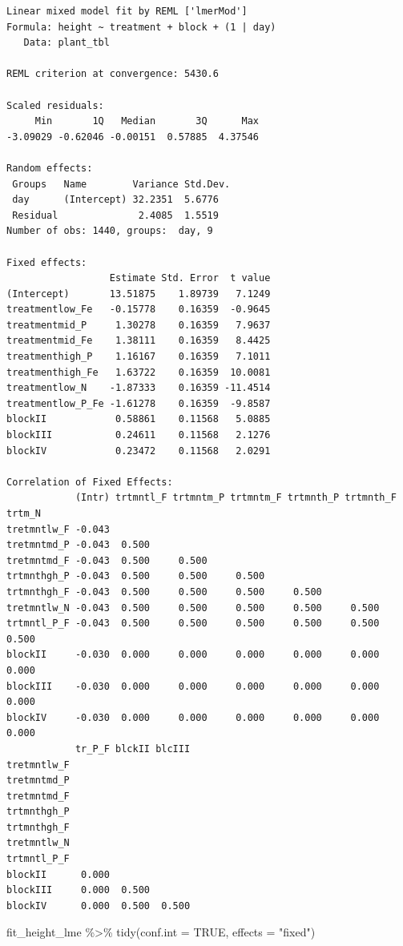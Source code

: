 \documentclass[
  letterpaper,
  DIV=11,
  oneside]{scrreport}
\newenvironment{Shaded}{\begin{snugshade}}{\end{snugshade}}
\newcommand{\AttributeTok}[1]{\textcolor[rgb]{0.40,0.45,0.13}{#1}}
\newcommand{\ConstantTok}[1]{\textcolor[rgb]{0.56,0.35,0.01}{#1}}
\newcommand{\FunctionTok}[1]{\textcolor[rgb]{0.28,0.35,0.67}{#1}}
\newcommand{\NormalTok}[1]{\textcolor[rgb]{0.00,0.23,0.31}{#1}}
\newcommand{\SpecialCharTok}[1]{\textcolor[rgb]{0.37,0.37,0.37}{#1}}
\newcommand{\StringTok}[1]{\textcolor[rgb]{0.13,0.47,0.30}{#1}}
\begin{document}
\begin{verbatim}
Linear mixed model fit by REML ['lmerMod']
Formula: height ~ treatment + block + (1 | day)
   Data: plant_tbl

REML criterion at convergence: 5430.6

Scaled residuals: 
     Min       1Q   Median       3Q      Max 
-3.09029 -0.62046 -0.00151  0.57885  4.37546 

Random effects:
 Groups   Name        Variance Std.Dev.
 day      (Intercept) 32.2351  5.6776  
 Residual              2.4085  1.5519  
Number of obs: 1440, groups:  day, 9

Fixed effects:
                  Estimate Std. Error  t value
(Intercept)       13.51875    1.89739   7.1249
treatmentlow_Fe   -0.15778    0.16359  -0.9645
treatmentmid_P     1.30278    0.16359   7.9637
treatmentmid_Fe    1.38111    0.16359   8.4425
treatmenthigh_P    1.16167    0.16359   7.1011
treatmenthigh_Fe   1.63722    0.16359  10.0081
treatmentlow_N    -1.87333    0.16359 -11.4514
treatmentlow_P_Fe -1.61278    0.16359  -9.8587
blockII            0.58861    0.11568   5.0885
blockIII           0.24611    0.11568   2.1276
blockIV            0.23472    0.11568   2.0291

Correlation of Fixed Effects:
            (Intr) trtmntl_F trtmntm_P trtmntm_F trtmnth_P trtmnth_F trtm_N
tretmntlw_F -0.043                                                         
tretmntmd_P -0.043  0.500                                                  
tretmntmd_F -0.043  0.500     0.500                                        
trtmnthgh_P -0.043  0.500     0.500     0.500                              
trtmnthgh_F -0.043  0.500     0.500     0.500     0.500                    
tretmntlw_N -0.043  0.500     0.500     0.500     0.500     0.500          
trtmntl_P_F -0.043  0.500     0.500     0.500     0.500     0.500     0.500
blockII     -0.030  0.000     0.000     0.000     0.000     0.000     0.000
blockIII    -0.030  0.000     0.000     0.000     0.000     0.000     0.000
blockIV     -0.030  0.000     0.000     0.000     0.000     0.000     0.000
            tr_P_F blckII blcIII
tretmntlw_F                     
tretmntmd_P                     
tretmntmd_F                     
trtmnthgh_P                     
trtmnthgh_F                     
tretmntlw_N                     
trtmntl_P_F                     
blockII      0.000              
blockIII     0.000  0.500       
blockIV      0.000  0.500  0.500
\end{verbatim}

\begin{Shaded}
\begin{Highlighting}[]
\NormalTok{fit\_height\_lme }\SpecialCharTok{\%\textgreater{}\%} 
  \FunctionTok{tidy}\NormalTok{(}\AttributeTok{conf.int =} \ConstantTok{TRUE}\NormalTok{, }\AttributeTok{effects =} \StringTok{"fixed"}\NormalTok{)}
\end{Highlighting}
\end{Shaded}
\end{document}
